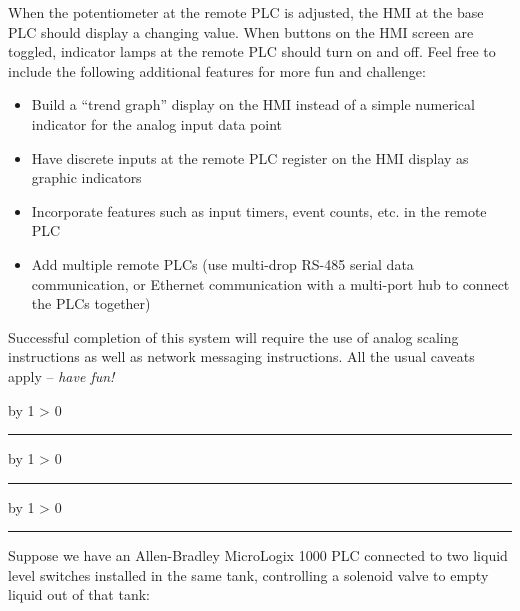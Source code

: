 \documentclass[12pt,a4paper]{article}
\def\oppgave{
            \advance\questnum by 1
            \ifnum \questnum > 0
                 \hrule
                 \vskip 3pt
                 \leftline{Oppgave \the\questnum}
                 \vskip 3pt \fi}
\def\svar{
           \advance\answnum by 1
           \ifnum \answnum > 0
                \hrule
                \vskip 3pt
                \leftline{Svar \the\answnum}
                \vskip 3pt \fi}
\def\notes{
           \advance\explnum by 1
           \ifnum \explnum > 0
                \hrule
                \vskip 3pt
                \leftline{Notes \the\explnum}
                \vskip 3pt \fi}
\begin{document}
When the potentiometer at the remote PLC is adjusted, the HMI at the base PLC should display a changing value.  When buttons on the HMI screen are toggled, indicator lamps at the remote PLC should turn on and off.  Feel free to include the following additional features for more fun and challenge:

\begin{itemize}
\item{} Build a ``trend graph'' display on the HMI instead of a simple numerical indicator for the analog input data point
\vskip 5pt
\item{} Have discrete inputs at the remote PLC register on the HMI display as graphic indicators
\vskip 5pt
\item{} Incorporate features such as input timers, event counts, etc. in the remote PLC
\vskip 5pt
\item{} Add multiple remote PLCs (use multi-drop RS-485 serial data communication, or Ethernet communication with a multi-port hub to connect the PLCs together)
\end{itemize}

\vskip 10pt

Successful completion of this system will require the use of analog scaling instructions as well as network messaging instructions.  All the usual caveats apply -- {\it have fun!}

\vfil 

\eject
\vskip 10pt \filbreak 





\svar{} 

 
\vskip 10pt \filbreak 





\notes{} 



\vfil \eject 



\oppgave{} 

Suppose we have an Allen-Bradley MicroLogix 1000 PLC connected to two liquid level switches installed in the same tank, controlling a solenoid valve to empty liquid out of that tank:
\end{document}
